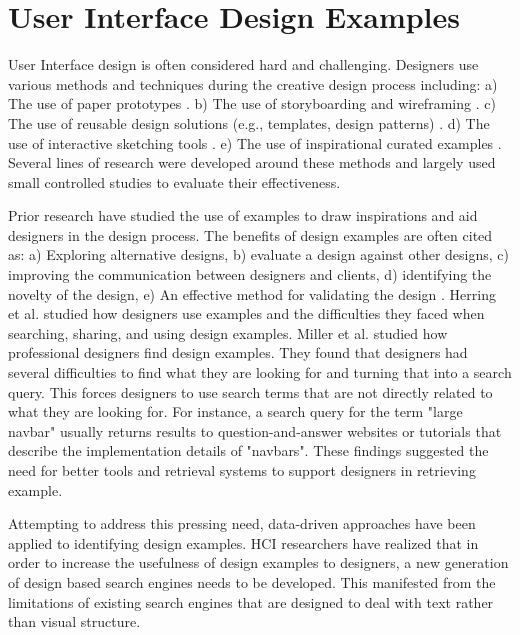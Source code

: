 \section{User Interface Design Examples}
User Interface design is often considered hard and challenging. Designers use various methods and techniques during the creative design process including: a) The use of paper prototypes \cite{newman_2000_DIS, klemmer_2001_UIST}. 
b) The use of storyboarding and wireframing \cite{newman_2000_DIS, wahid_2011_CHI}. 
c) The use of reusable design solutions (e.g., templates, design patterns) \cite{jacobs_2003_TOG, gibson_2005_WWW, ritchie_2011_CHI}.
d) The use of interactive sketching tools \cite{landay_1995_CHI, lin_2002_CHI, Newman_2003_HCI, sezgin_2006_GRAPH}.
e) The use of inspirational curated examples \cite{purcell_1992_KBS, herring_2009_CHI, lee_2010_CHI, ritchie_2011_CHI, miller_2014_ASME}.
Several lines of research were developed around these methods and largely used small controlled studies to evaluate their effectiveness.

Prior research have studied the use of examples to draw inspirations and aid designers in the design process.
The benefits of design examples are often cited as: 
a) Exploring alternative designs, 
b) evaluate a design against other designs, 
c) improving the communication between designers and clients, 
d) identifying the novelty of the design, 
e) An effective method for validating the design \cite{purcell_1992_KBS, herring_2009_CHI, lee_2010_CHI, ritchie_2011_CHI, chang_2012_CHI, miller_2014_ASME}.
Herring et al. \cite{herring_2009_CHI} studied how designers use examples and the difficulties they faced when searching, sharing, and using design examples.
Miller et al. \cite{miller_2014_ASME} studied how professional designers find design examples.
They found that designers had several difficulties to find what they are looking for and turning that into a search query.
This forces designers to use search terms that are not directly related to what they are looking for.
For instance, a search query for the term "large navbar" usually returns results to question-and-answer websites or tutorials that describe the implementation details of "navbars".
These findings suggested the need for better tools and retrieval systems to support designers in retrieving example.


Attempting to address this pressing need, data-driven approaches have been applied to identifying design examples.
HCI researchers have realized that in order to increase the usefulness of design examples to designers, a new generation of design based search engines needs to be developed.
This manifested from the limitations of existing search engines that are designed to deal with text rather than visual structure.

